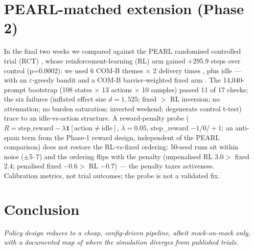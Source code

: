 \documentclass[11pt,a4paper]{article}
\begin{document}
\section{PEARL-matched extension (Phase 2)}
In the final two weeks we compared against the PEARL randomised
controlled trial (RCT) \cite{lee2025pearl}, whose reinforcement-learning (RL)
arm gained $+$295.9 steps
over control (p=0.0002): we used
6 COM-B themes
$\times$ 2 delivery times \cite{michie2011com}, plus idle
--- with an $\varepsilon$-greedy bandit and a COM-B barrier-weighted fixed arm
\cite{liu2025thompson,ghosh2024rebandit,tomkins2021intelligentpooling}. The
14{,}040-prompt bootstrap (108 states $\times$ 13 actions $\times$ 10 samples)
passed 11 of 17 checks; the six failures
(inflated effect size $d{=}1{,}525$; fixed $>$ RL inversion; no attenuation;
no burden saturation; inverted weekend; degenerate control t-test) trace to
an idle-vs-action structure. A reward-penalty probe
($R=\mathrm{step\_reward}-\lambda\mathbf{1}[\mathrm{action}\ne\mathrm{idle}]$,
$\lambda=0.05$, step\_reward $-1/0/+1$; an anti-spam term from the Phase-1
reward design, independent of the PEARL comparison) does not restore the
RL-vs-fixed ordering: 50-seed runs sit within noise ($\pm$5--7) and the
ordering flips with the penalty (unpenalised RL $3.0>$ fixed $2.4$; penalised
fixed $-0.6>$ RL $-0.7$) --- the penalty taxes activeness. Calibration
metrics, not trial outcomes; the probe is not a validated fix.

\section{Conclusion}
\emph{Policy design reduces to a cheap, config-driven pipeline, albeit
mock-on-mock only, with a documented map of where the simulation diverges from
published trials.}
\clearpage
\begingroup


\endgroup
\end{document}
